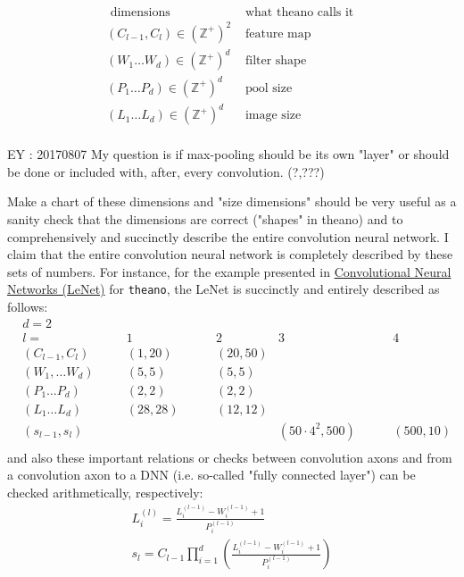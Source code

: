 \documentclass[10pt]{amsart}
\begin{document}
\begin{multicols*}{2}
\begin{equation}
\begin{aligned}
\text{ dimensions } & \text{ what theano calls it } \\ 
(C_{l-1}, C_l) \in (\mathbb{Z}^+)^2 & \text{ feature map } \\ 
(W_1 \dots W_d) \in (\mathbb{Z}^+)^d & \text{ filter shape }  \\
(P_1 \dots P_d) \in (\mathbb{Z}^+)^d & \text{ pool size  }  \\ 
(L_1 \dots L_d) \in (\mathbb{Z}^+)^d & \text{ image size }  \\
\end{aligned}
\end{equation}

EY : 20170807 My question is if max-pooling should be its own "layer" or should be done or included with, after, every convolution.  (?,???)

Make a chart of these dimensions and "size dimensions" should be very useful as a sanity check that the dimensions are correct ("shapes" in theano) and to comprehensively and succinctly describe the entire convolution neural network.  I claim that the entire convolution neural network is completely described by these sets of numbers.  For instance, for the example presented in 
\href{http://deeplearning.net/tutorial/lenet.html}{Convolutional Neural Networks (LeNet)} for \verb|theano|, the LeNet is succinctly and entirely described as follows:  
\[
\begin{aligned}
& d=2 &  &  & & \\
& l = & 1  \qquad \, &  2 & 3 & \qquad \, 4  \\
& (C_{l-1}, C_l ) \qquad \, & (1,20) \qquad \, & (20,50) & & \\
& (W_1, \dots W_d) & (5,5) \qquad \, &  (5,5) & & \\ 
& (P_1 \dots P_d) & (2,2) \qquad \, & (2,2) & & \\
& (L_1\dots L_d) & (28,28) \qquad \, & (12,12) & & \\ 
& (s_{l-1}, s_l) &                 &              & (50\cdot 4^2, 500) & \qquad \, (500,10)  \\
\end{aligned}
\]
and also these important relations or checks between convolution axons and from a convolution axon to a DNN (i.e. so-called "fully connected layer") can be checked arithmetically, respectively:
\begin{equation}
\begin{gathered}
	L_i^{(l)} = \frac{L_i^{(l-1)} - W_i^{(l-1)} + 1}{ P_i^{(l-1)} } \\ 
s_l = C_{l-1} \prod_{i=1}^d \left( \frac{ L_i^{(l-1)} - W_i^{(l-1)} + 1}{ P_i^{(l-1)} } \right) 
\end{gathered}
\end{equation}



\end{multicols*}
\end{document}

